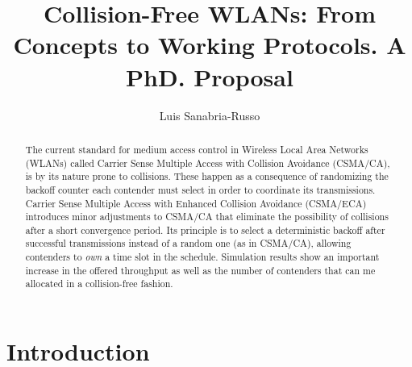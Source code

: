 \documentclass[]{llncs}
\begin{document}
\title{Collision-Free WLANs: From Concepts to Working Protocols. A PhD. Proposal}
\author{Luis Sanabria-Russo}
\maketitle

\begin{abstract}
The current standard for medium access control in Wireless Local Area Networks (WLANs) called Carrier Sense Multiple Access with Collision Avoidance (CSMA/CA), is by its nature prone to collisions. These happen as a consequence of randomizing the backoff counter each contender must select in order to coordinate its transmissions. Carrier Sense Multiple Access with Enhanced Collision Avoidance (CSMA/ECA) introduces minor adjustments to CSMA/CA  that eliminate the possibility of collisions after a short convergence period. Its principle is to select a deterministic backoff after successful transmissions instead of a random one (as in CSMA/CA), allowing contenders to \emph{own} a time slot in the schedule. Simulation results show an important increase in the offered throughput as well as the number of contenders that can me allocated in a collision-free fashion.
\end{abstract}

\section{Introduction}\label{introduction}
	



\end{document}
